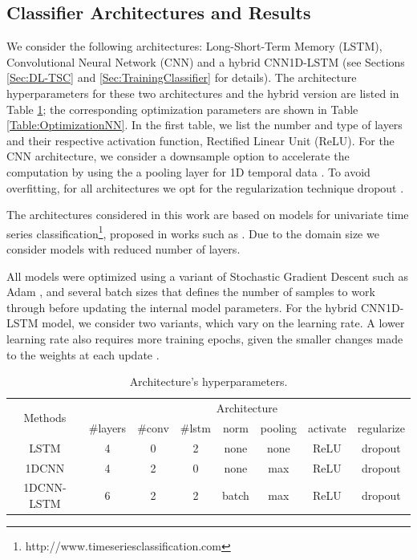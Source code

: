 \subsection{Classifier Architectures and Results}
\label{Sec:TSC_NN_Results}

We consider the following architectures: Long-Short-Term Memory (LSTM), Convolutional Neural Network (CNN) and a hybrid CNN1D-LSTM (see Sections \ref{Sec:DL-TSC} and \ref{Sec:TrainingClassifier} for details). The architecture hyperparameters for these two architectures and the hybrid version are listed in Table \ref{Table:HyperparametersNN}; the corresponding optimization parameters are shown in Table \ref{Table:OptimizationNN}. In the first table, we list the number and type of layers and their respective activation function, Rectified Linear Unit (ReLU). For the CNN architecture, we consider a downsample option to accelerate the computation by using the a pooling layer for 1D temporal data \cite{Gholamalinezhad2020}. To avoid overfitting, for all architectures we opt for the regularization technique dropout \cite{Srivastava2014, Baldi2013}. 

The architectures considered in this work are based on models for univariate time series classification\footnote{http://www.timeseriesclassification.com}, proposed in works such as \cite{Bagnall2017a, Fawaz2019}. Due to the domain size we consider models with reduced number of layers.

All models were optimized using a variant of Stochastic Gradient Descent such as Adam \cite{Kingma2015}, and several batch sizes that defines the number of samples to work through before updating the internal model parameters. For the hybrid CNN1D-LSTM model, we consider two variants, which vary on the learning rate. A lower learning rate also requires more training epochs, given the smaller changes made to the weights at each update \cite{Patterson2017}.

\begin{table}[h]
	\centering
	\small
	\begin{tabular}{|c|c|c|c|c|c|c|c|}
		\hline
		\multirow{2}{*}{Methods} & \multicolumn{7}{c|}{Architecture} \\
		\cline{2-8}
		& \#layers & \#conv & \#lstm & norm & pooling & activate & regularize \\
		\cline{2-8}
		\hline
		LSTM & 4 & 0 & 2 & none & none & ReLU & dropout \\
		\hline
		1DCNN & 4 & 2 & 0 & none & max & ReLU & dropout \\
		\hline
		1DCNN-LSTM & 6 & 2 & 2 & batch & max & ReLU & dropout  \\
		\hline
	\end{tabular}
	\caption{Architecture’s hyperparameters.}
	\label{Table:HyperparametersNN}
\end{table}

